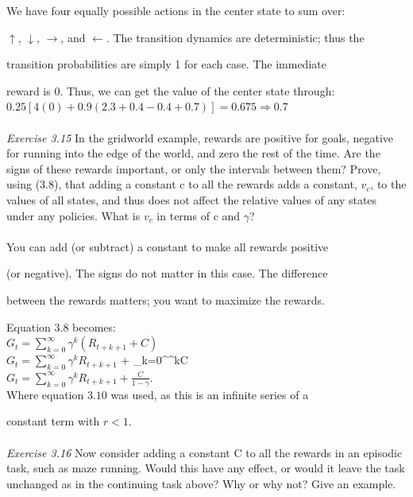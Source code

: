 \documentclass{article}
\begin{document}
We have four equally possible actions in the center state to sum over:

$\uparrow$, $\downarrow$, $\rightarrow$, and $\leftarrow$. The transition dynamics are deterministic; thus the 

transition probabilities are simply 1 for each case. The immediate 

reward is 0. Thus, we can get the value of the center state through:\\

$0.25[4(0) + 0.9(2.3 + 0.4 - 0.4 + 0.7)] = 0.675 \Rightarrow 0.7$
\\\\
\textit{Exercise 3.15} In the gridworld example, rewards are
positive for goals, negative for running into the edge of the world,
and zero the rest of the time. Are the signs of these rewards important, or only the intervals between them? Prove, using (3.8), that adding a constant c to all the rewards adds a constant, $v_c$, to the values of all states, and thus does not affect the relative values of any states under any policies. What is $v_c$ in terms
of c and $\gamma$?\\
\\

You can add (or subtract) a constant to make all rewards positive

(or negative). The signs do not matter in this case. The difference 

between the rewards matters; you want to maximize the rewards. 

Equation 3.8 becomes: \\

$G_t = \sum_{k=0}^{\infty}\gamma^{k}(R_{t+k+1} + C)$\\

$G_t = \sum_{k=0}^{\infty}\gamma^{k}R_{t+k+1}$ + \sum_{k=0}^{\infty}\gamma^{k}C\\

$G_t = \sum_{k=0}^{\infty}\gamma^{k}R_{t+k+1} + \frac{C}{1-\gamma}.$\\


Where equation $3.10$ was used, as this is an infinite series of a 

constant term with $r < 1$.
\\\\
\textit{Exercise 3.16} Now consider adding a constant C to all the rewards in an episodic task, such as maze running. Would this have any effect, or would it leave the task unchanged as in the continuing task above? Why or why not? Give an example. \\
\\
\end{document}
